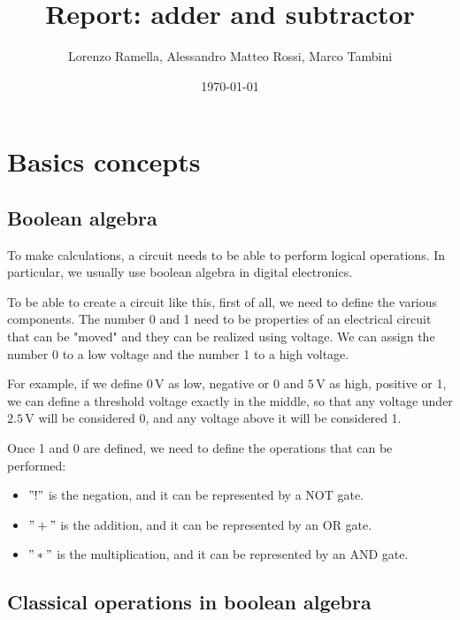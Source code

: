 \documentclass{article}
\title{Report: adder and subtractor}
\author{Lorenzo Ramella, Alessandro Matteo Rossi, Marco Tambini}
\date{\today}
\begin{document}
\maketitle

\tableofcontents

\clearpage

\section{Basics concepts}

\subsection{Boolean algebra}
To make calculations, a circuit needs to be able to perform logical operations. In particular, we usually use boolean algebra in digital electronics. 

\vspace{3mm}

To be able to create a circuit like this, first of all, we need to define the various components.
The number 0 and 1 need to be properties of an electrical circuit that can be "moved" and they can be realized using voltage. We can assign the number 0 to a low voltage and the number 1 to a high voltage. 

\vspace{3mm}

For example, if we define $0\,\textrm{V}$ as low, negative or 0 and $5\,\textrm{V}$ as high, positive or 1, we can define a threshold voltage exactly in the middle, so that any voltage under $2.5\,\textrm{V}$ will be considered 0, and any voltage above it will be considered 1.

\vspace{3mm}

Once 1 and 0 are defined, we need to define the operations that can be performed:

\begin{itemize}
\item $"!"$ is the negation, and it can be represented by a NOT gate.
\item $"+"$ is the addition, and it can be represented by an OR gate.
\item $"*"$ is the multiplication, and it can be represented by an AND gate.
\end{itemize}



\subsection{Classical operations in boolean algebra}
\end{document}
